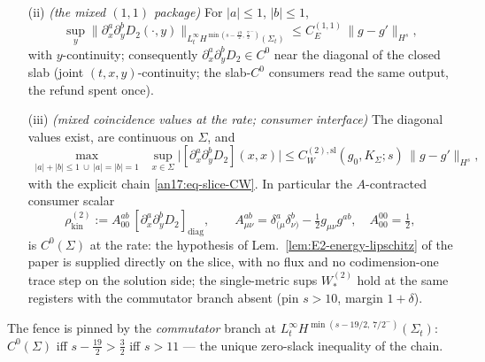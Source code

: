 \begin{lemma}[$N{=}2$ two-slot difference-system energy estimate, slice
register; the mixed $(1,1)$ coincidence value at the Lipschitz rate for
$s>n/2+9=11$, zero slack]
\begin{itemize}
\[   \le C^{(b)}_E\,\|g-g'\|_{H^s},
  \]
  uniformly in $y\in K_\Sigma$; the $\partial_0$-components are Tice unknowns of
  the first-order reduction, \emph{not} traces.
\item[(ii)] \emph{(the mixed $(1,1)$ package)} For $|a|\le1$, $|b|\le1$,
  \[
   \sup_y\bigl\|\partial_x^a\partial_y^bD_2(\cdot,y)
   \bigr\|_{L^\infty_t H^{\min(s-\frac{19}2,\,\frac72^-)}(\Sigma_t)}
   \le C^{(1,1)}_E\,\|g-g'\|_{H^s},
  \]
  with $y$-continuity; consequently $\partial_x^a\partial_y^bD_2\in C^0$ near
  the diagonal of the closed slab (joint $(t,x,y)$-continuity; the slab-$C^0$
  consumers read the same output, the refund spent once).
\item[(iii)] \emph{(mixed coincidence values at the rate; consumer interface)}
  The diagonal values exist, are continuous on $\Sigma$, and
  \begin{equation}\label{an17:eq-slice-diag}
   \max_{\substack{|a|+|b|\le1\ \cup\ |a|=|b|=1}}\ \sup_{x\in\Sigma}
   \bigl|[\partial_x^a\partial_y^bD_2](x,x)\bigr|
   \le C^{(2),\mathrm{sl}}_W(g_0,K_\Sigma;s)\,\|g-g'\|_{H^s},
  \end{equation}
  with the explicit chain \eqref{an17:eq-slice-CW}. In particular the
  $A$-contracted consumer scalar
  \[
   \rho^{(2)}_{\mathrm{kin}}
   :=A^{ab}_{00}\,[\partial_x^a\partial_y^bD_2]_{\mathrm{diag}},
   \qquad
   A^{ab}_{\mu\nu}=\delta^a_{(\mu}\delta^b_{\nu)}-\tfrac12 g_{\mu\nu}g^{ab},
   \quad A^{00}_{00}=\tfrac12,
  \]
  is $C^0(\Sigma)$ at the rate: the hypothesis of
  Lem.~\ref{lem:E2-energy-lipschitz} of the paper is supplied directly on the
  slice, with no flux and no codimension-one trace step on the solution side;
  the single-metric sups $W^{(2)}_*$ hold at the same registers with the
  commutator branch absent (pin $s>10$, margin $1+\delta$).
\end{itemize}
The fence is pinned by the \emph{commutator} branch at
$L^\infty_t H^{\min(s-19/2,\,7/2^-)}(\Sigma_t)$: $C^0(\Sigma)$ iff
$s-\tfrac{19}2>\tfrac32$ iff $s>11$ --- the unique zero-slack inequality of the
chain.


\end{lemma}
